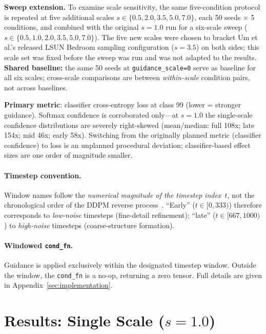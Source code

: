\documentclass[10pt]{article}
\begin{document}
\textbf{Sweep extension.}  To examine scale sensitivity, the same five-condition
protocol is repeated at five additional scales
$s\in\{0.5,2.0,3.5,5.0,7.0\}$, each 50 seeds $\times$ 5 conditions, and combined
with the original $s=1.0$ run for a six-scale sweep
($s\in\{0.5,1.0,2.0,3.5,5.0,7.0\}$).  The five new scales were chosen to bracket
Um et al.'s released LSUN Bedroom sampling configuration ($s=3.5$) on both sides; this scale set
was fixed before the sweep was run and was not adapted to the results.
\textbf{Shared baseline:} the same 50 seeds at \texttt{guidance\_scale=0} serve
as baseline for all six scales; cross-scale comparisons are between
\emph{within-scale} condition pairs, not across baselines.

\textbf{Primary metric}: classifier cross-entropy loss at class 99 (lower =
stronger guidance).  Softmax confidence is corroborated only---at $s=1.0$ the
single-scale confidence distributions are severely right-skewed (mean/median:
full 108x; late 154x; mid 46x; early 58x).  Switching from the originally planned metric (classifier confidence) to loss is an
unplanned procedural deviation; classifier-based effect sizes are one order of
magnitude smaller.

\paragraph{Timestep convention.}
Window names follow the \emph{numerical magnitude of the timestep
index~$t$}, not the chronological order of the DDPM reverse
process~\cite{ho2020ddpm}.  ``Early'' ($t\!\in\![0,333)$) therefore
corresponds to \emph{low-noise} timesteps (fine-detail refinement);
``late'' ($t\!\in\![667,1000)$) to \emph{high-noise} timesteps
(coarse-structure formation).

\paragraph{Windowed \texttt{cond\_fn}.}
Guidance is applied exclusively within the designated timestep window.
Outside the window, the \texttt{cond\_fn} is a no-op, returning a zero tensor.  Full details are given in Appendix~\ref{sec:implementation}.

\section{Results: Single Scale ($s=1.0$)}
\label{sec:results}
\end{document}
